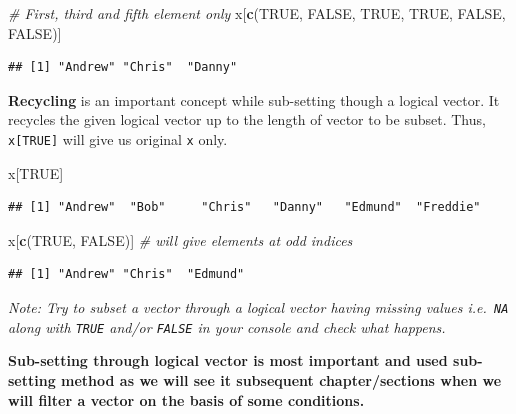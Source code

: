 \documentclass[
]{book}
\newenvironment{Shaded}{\begin{snugshade}}{\end{snugshade}}
\newcommand{\CommentTok}[1]{\textcolor[rgb]{0.56,0.35,0.01}{\textit{#1}}}
\newcommand{\ConstantTok}[1]{\textcolor[rgb]{0.56,0.35,0.01}{#1}}
\newcommand{\FunctionTok}[1]{\textcolor[rgb]{0.13,0.29,0.53}{\textbf{#1}}}
\newcommand{\NormalTok}[1]{#1}
\begin{document}
\begin{Shaded}
\begin{Highlighting}[]
\CommentTok{\# First, third and fifth element only}
\NormalTok{x[}\FunctionTok{c}\NormalTok{(}\ConstantTok{TRUE}\NormalTok{, }\ConstantTok{FALSE}\NormalTok{, }\ConstantTok{TRUE}\NormalTok{, }\ConstantTok{TRUE}\NormalTok{, }\ConstantTok{FALSE}\NormalTok{, }\ConstantTok{FALSE}\NormalTok{)]}
\end{Highlighting}
\end{Shaded}

\begin{verbatim}
## [1] "Andrew" "Chris"  "Danny"
\end{verbatim}

\textbf{Recycling} is an important concept while sub-setting though a logical vector. It recycles the given logical vector up to the length of vector to be subset. Thus, \texttt{x{[}TRUE{]}} will give us original \texttt{x} only.

\begin{Shaded}
\begin{Highlighting}[]
\NormalTok{x[}\ConstantTok{TRUE}\NormalTok{]}
\end{Highlighting}
\end{Shaded}

\begin{verbatim}
## [1] "Andrew"  "Bob"     "Chris"   "Danny"   "Edmund"  "Freddie"
\end{verbatim}

\begin{Shaded}
\begin{Highlighting}[]
\NormalTok{x[}\FunctionTok{c}\NormalTok{(}\ConstantTok{TRUE}\NormalTok{, }\ConstantTok{FALSE}\NormalTok{)] }\CommentTok{\# will give elements at odd indices}
\end{Highlighting}
\end{Shaded}

\begin{verbatim}
## [1] "Andrew" "Chris"  "Edmund"
\end{verbatim}

\emph{Note: Try to subset a vector through a logical vector having missing values i.e.~\texttt{NA} along with \texttt{TRUE} and/or \texttt{FALSE} in your console and check what happens.}

\textbf{Sub-setting through logical vector is most important and used sub-setting method as we will see it subsequent chapter/sections when we will filter a vector on the basis of some conditions.}
\end{document}
